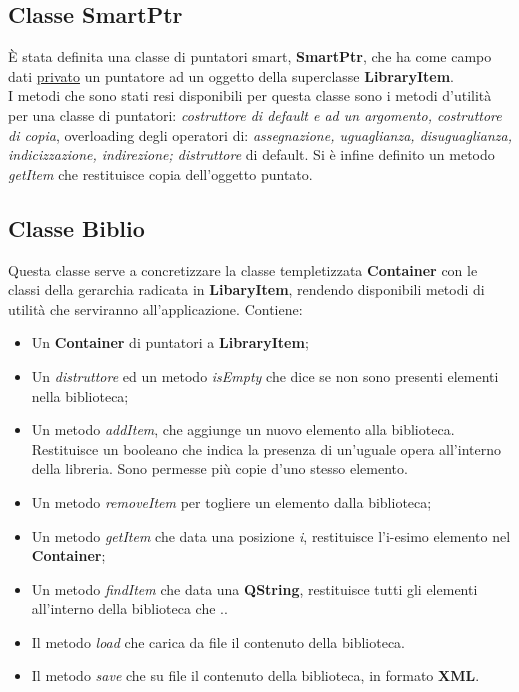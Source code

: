 {		\subsection{Classe SmartPtr}{
			È stata definita una classe di puntatori smart, \textbf{SmartPtr}, che ha come campo dati \underline{privato} un puntatore ad un oggetto della superclasse \textbf{LibraryItem}. \\
			I metodi che sono stati resi disponibili per questa classe sono i metodi d'utilità per una classe di puntatori:
			\textit{costruttore di default e ad un argomento, costruttore di copia}, overloading degli operatori di: \textit{assegnazione, uguaglianza, disuguaglianza, indicizzazione, indirezione; distruttore} di default. Si è infine definito un metodo \textit{getItem} che restituisce copia dell'oggetto puntato.
		}
		\subsection{Classe Biblio}{
			Questa classe serve a concretizzare la classe templetizzata \textbf{Container} con le classi della gerarchia radicata in \textbf{LibaryItem}, rendendo disponibili metodi di utilità che serviranno all'applicazione. Contiene:
			\begin{itemize}\itemsep=0.5pt
				\item Un \textbf{Container} di puntatori a \textbf{LibraryItem};
				\item Un \textit{distruttore} ed un metodo \textit{isEmpty} che dice se non sono presenti elementi nella biblioteca;
				\item Un  metodo \textit{addItem}, che aggiunge un nuovo elemento alla biblioteca. Restituisce un booleano che indica la presenza di un'uguale opera all'interno della libreria. Sono permesse più copie d'uno stesso elemento.
				\item Un metodo \textit{removeItem} per togliere un elemento dalla biblioteca;
				\item Un metodo \textit{getItem} che data una posizione \textit{i}, restituisce l'i-esimo elemento nel \textbf{Container};
				\item Un metodo \textit{findItem} che data una \textbf{QString}, restituisce tutti gli elementi all'interno della biblioteca che ..
				\item Il metodo \textit{load} che carica da file il contenuto della biblioteca.
				\item Il metodo \textit{save} che su file il contenuto della biblioteca, in formato \textbf{XML}.
				
			\end{itemize}
		}
	}